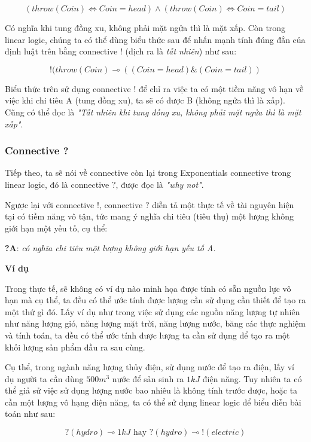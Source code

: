 $$ (throw(Coin) \Leftrightarrow Coin = head) \wedge (throw(Coin)  \Leftrightarrow Coin
 = tail) $$

Có nghĩa khi tung đồng xu, không phải mặt ngửa thì là mặt xấp. Còn trong linear logic, chúng ta có thể dùng biểu thức sau để nhấn mạnh tính đúng đắn của định luật trên bằng connective $ ! $ (dịch ra là \textit{tất nhiên}) như sau:

$$ ! (throw(Coin) \multimap ( (Coin = head) \& (Coin = tail)) $$

Biểu thức trên sử dụng connective $ ! $ để chỉ ra việc ta có một tiềm năng vô hạn về việc khi chi tiêu A (tung đồng xu), ta sẽ có được B (không ngửa thì là xấp). Cũng có thể đọc là \textit{"Tất nhiên khi tung đồng xu, không phải mặt ngửa thì là mặt xấp"}.

\subsubsection{Connective ?}
Tiếp theo, ta sẽ nói về connective còn lại trong Exponentials connective trong linear logic, đó là connective $ ? $, được đọc là \textit{"why not"}.

Ngược lại với connective $ ! $, connective $ ? $ diễn tả một thực tế về tài nguyên hiện tại có tiềm năng vô tận, tức mang ý nghĩa chi tiêu (tiêu thụ) một lượng không giới hạn một yếu tố, cụ thể:

\begin{center}
\textbf{?A}: \textit{có nghĩa chi tiêu một lượng không giới hạn yếu tố A.}
\end{center}


\textbf{Ví dụ}


Trong thực tế, sẽ không có ví dụ nào minh họa được tính có sẵn nguồn lực vô hạn mà cụ thể, ta đều có thể ước tính được lượng cần sử dụng cần thiết để tạo ra một thứ gì đó. Lấy ví dụ như trong việc sử dụng các nguồn năng lượng tự nhiên như năng lượng gió, năng lượng mặt trời, năng lượng nước, băng các thực nghiệm và tính toán, ta đều có thể ước tính được lượng ta cần sử dụng để tạo ra một khối lượng sản phẩm đầu ra sau cùng.

Cụ thể, trong ngành năng lượng thủy điện, sử dụng nước để tạo ra điện, lấy ví dụ người ta cần dùng $ 500 m^{3} $ nước để sản sinh ra $ 1 kJ $ điện năng. Tuy nhiên ta có thể giả sử việc sử dụng lượng nước bao nhiêu là không tính trước được, hoặc ta cần một lượng vô hạng điện năng, ta có thể sử dụng linear logic để biểu diễn bài toán như sau:

$$ ?(hydro) \multimap 1 kJ \text{ hay } ?(hydro) \multimap !(electric) $$

